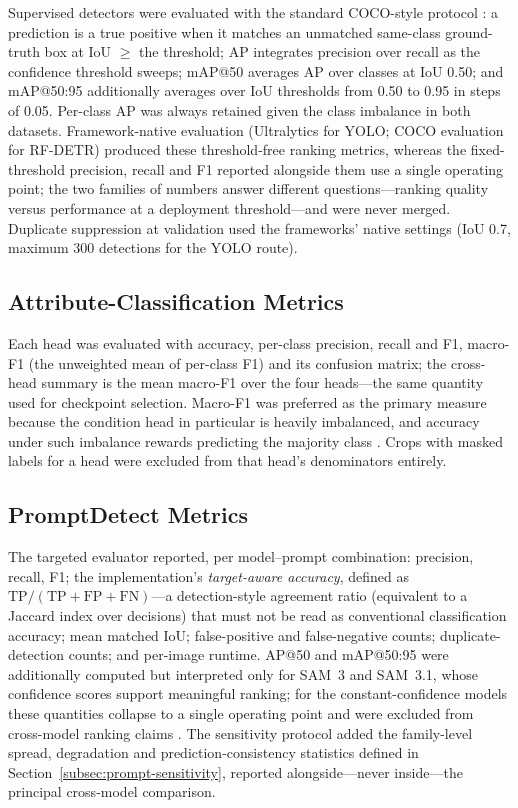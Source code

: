 Supervised detectors were evaluated with the standard COCO-style protocol \citep{lin2014microsoft,padilla2021comparative}: a prediction is a true positive when it matches an unmatched same-class ground-truth box at IoU $\geq$ the threshold; AP integrates precision over recall as the confidence threshold sweeps; mAP@50 averages AP over classes at IoU 0.50; and mAP@50:95 additionally averages over IoU thresholds from 0.50 to 0.95 in steps of 0.05. Per-class AP was always retained given the class imbalance in both datasets. Framework-native evaluation (Ultralytics for YOLO; COCO evaluation for RF-DETR) produced these threshold-free ranking metrics, whereas the fixed-threshold precision, recall and F1 reported alongside them use a single operating point; the two families of numbers answer different questions---ranking quality versus performance at a deployment threshold---and were never merged. Duplicate suppression at validation used the frameworks' native settings (IoU 0.7, maximum 300 detections for the YOLO route).

\subsection{Attribute-Classification Metrics}

Each head was evaluated with accuracy, per-class precision, recall and F1, macro-F1 (the unweighted mean of per-class F1) and its confusion matrix; the cross-head summary is the mean macro-F1 over the four heads---the same quantity used for checkpoint selection. Macro-F1 was preferred as the primary measure because the condition head in particular is heavily imbalanced, and accuracy under such imbalance rewards predicting the majority class \citep{sokolova2009systematic}. Crops with masked labels for a head were excluded from that head's denominators entirely.

\subsection{PromptDetect Metrics}

The targeted evaluator reported, per model--prompt combination: precision, recall, F1; the implementation's \emph{target-aware accuracy}, defined as $\mathrm{TP}/(\mathrm{TP}+\mathrm{FP}+\mathrm{FN})$---a detection-style agreement ratio (equivalent to a Jaccard index over decisions) that must not be read as conventional classification accuracy; mean matched IoU; false-positive and false-negative counts; duplicate-detection counts; and per-image runtime. AP@50 and mAP@50:95 were additionally computed but interpreted only for SAM~3 and SAM~3.1, whose confidence scores support meaningful ranking; for the constant-confidence models these quantities collapse to a single operating point and were excluded from cross-model ranking claims \citep{guo2017calibration}. The sensitivity protocol added the family-level spread, degradation and prediction-consistency statistics defined in Section~\ref{subsec:prompt-sensitivity}, reported alongside---never inside---the principal cross-model comparison.

